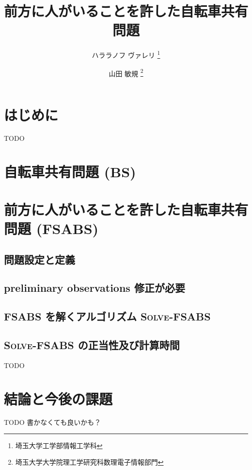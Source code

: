 \documentclass{la-preprint}
\title{前方に人がいることを許した自転車共有問題}
\author{
	ハララノフ ヴァレリ \thanks{埼玉大学工学部情報工学科} \and
	山田 敏規 \thanks{埼玉大学大学院理工学研究科数理電子情報部門} \and
}
\date{}
\begin{document}
\section{はじめに}
TODO
\section{自転車共有問題 (BS)}

\section{前方に人がいることを許した自転車共有問題 (FSABS) }
\subsection{問題設定と定義}

\subsection{preliminary observations {\color{red}修正が必要}}

\subsection{FSABS を解くアルゴリズム \textsc{Solve-FSABS}}

\subsection{\textsc{Solve-FSABS} の正当性及び計算時間}
TODO
\section{結論と今後の課題}
TODO
書かなくても良いかも？


\end{document}

